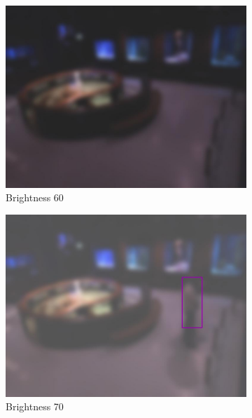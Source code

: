 \begin{figure}[H]
    \centering
    \begin{subfigure}{0.32\textwidth}
        \centering
        \includegraphics[width=\textwidth]{Images/DeviceImages/1st-iteration/hallvard-090224-141936-0-bright60.jpg}
        \caption{Brightness 60}
    \end{subfigure}
    \hfill
    \begin{subfigure}{0.32\textwidth}
        \centering
        \includegraphics[width=1\textwidth]{Images/DeviceImages/1st-iteration/hallvard-090224-134417-1-bright70.jpg}
        \caption{Brightness 70}
    \end{subfigure}
    \hfill
    \begin{subfigure}{0.32\textwidth}

\end{subfigure}
\end{figure}
